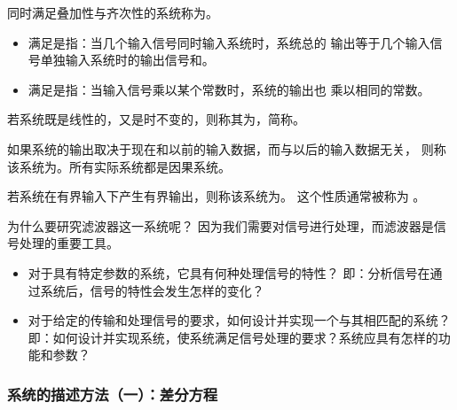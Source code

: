 \begin{definition}[线性系统]
    同时满足叠加性与齐次性的系统称为。
    \begin{itemize}
        \item 满足是指：当几个输入信号同时输入系统时，系统总的
            输出等于几个输入信号单独输入系统时的输出信号和。
        \item 满足是指：当输入信号乘以某个常数时，系统的输出也
            乘以相同的常数。
    \end{itemize}
\end{definition}

\begin{definition}[时不变系统]
    若系统既是线性的，又是时不变的，则称其为，简称。
\end{definition}

\begin{definition}[因果系统]
    如果系统的输出取决于现在和以前的输入数据，而与以后的输入数据无关，
    则称该系统为。所有实际系统都是因果系统。
\end{definition}

\begin{definition}[稳定系统]
    若系统在有界输入下产生有界输出，则称该系统为。
    这个性质通常被称为 。
\end{definition}

\begin{remark}
    为什么要研究滤波器这一系统呢？
    因为我们需要对信号进行处理，而滤波器是信号处理的重要工具。
    \begin{itemize}
        \item 对于具有特定参数的系统，它具有何种处理信号的特性？
            \subitem 即：分析信号在通过系统后，信号的特性会发生怎样的变化？
        \item 对于给定的传输和处理信号的要求，如何设计并实现一个与其相匹配的系统？
            \subitem 即：如何设计并实现系统，使系统满足信号处理的要求？系统应具有怎样的功能和参数？
    \end{itemize}
\end{remark}

\subsubsection{系统的描述方法（一）：差分方程}

\label{subsubsection:diff-equation-representation}

